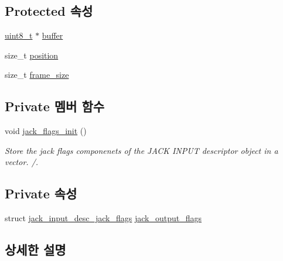 \subsection*{Protected 속성}
\begin{DoxyCompactItemize}
\item 
\hyperlink{stdint_8h_aba7bc1797add20fe3efdf37ced1182c5}{uint8\+\_\+t} $\ast$ \hyperlink{classavdecc__lib_1_1descriptor__response__base__imp_a56ed84df35de10bdb65e72b184309497}{buffer}
\item 
size\+\_\+t \hyperlink{classavdecc__lib_1_1descriptor__response__base__imp_a7a04afe5347934be732ec70a70bd0a28}{position}
\item 
size\+\_\+t \hyperlink{classavdecc__lib_1_1descriptor__response__base__imp_affd041a595cabab98275245b9cb2824d}{frame\+\_\+size}
\end{DoxyCompactItemize}
\subsection*{Private 멤버 함수}
\begin{DoxyCompactItemize}
\item 
void \hyperlink{classavdecc__lib_1_1jack__output__descriptor__response__imp_a6de95e6c9b0a71154f1451a6a19da19f}{jack\+\_\+flags\+\_\+init} ()
\begin{DoxyCompactList}\small\item\em Store the jack flags componenets of the J\+A\+CK I\+N\+P\+UT descriptor object in a vector. /. \end{DoxyCompactList}\end{DoxyCompactItemize}
\subsection*{Private 속성}
\begin{DoxyCompactItemize}
\item 
struct \hyperlink{structavdecc__lib_1_1jack__output__descriptor__response__imp_1_1jack__input__desc__jack__flags}{jack\+\_\+input\+\_\+desc\+\_\+jack\+\_\+flags} \hyperlink{classavdecc__lib_1_1jack__output__descriptor__response__imp_a453d7341e896ff0bc55ce23959745aa1}{jack\+\_\+output\+\_\+flags}
\end{DoxyCompactItemize}


\subsection{상세한 설명}


